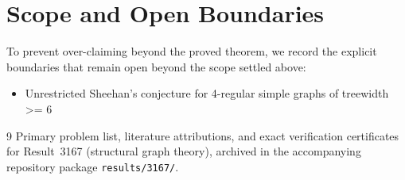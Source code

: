 \documentclass[10pt,reqno]{amsart}
\theoremstyle{definition}
\begin{document}
\section{Scope and Open Boundaries}

To prevent over-claiming beyond the proved theorem, we record the explicit boundaries that remain open beyond the scope settled above:
\begin{itemize}
  \item Unrestricted Sheehan's conjecture for 4-regular simple graphs of treewidth >= 6
\end{itemize}

\begin{thebibliography}{9}
Primary problem list, literature attributions, and exact verification certificates for Result~3167 (structural graph theory), archived in the accompanying repository package \texttt{results/3167/}.
\end{thebibliography}
\end{document}
